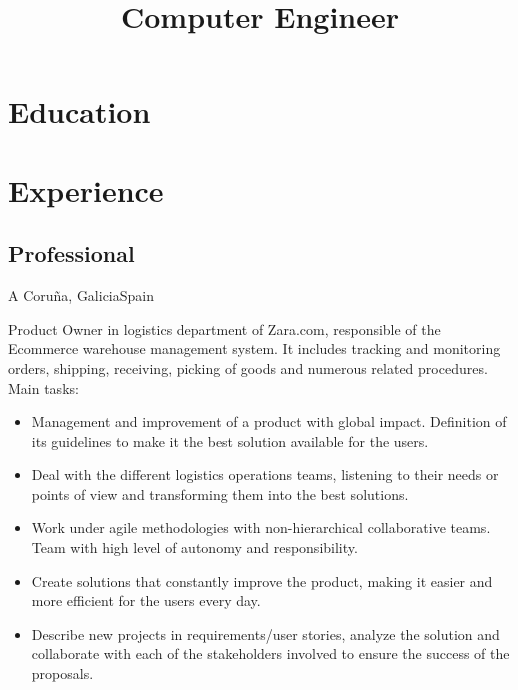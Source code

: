\documentclass[11pt,a4paper,sans]{moderncv}        %
\title{Computer Engineer}
\begin{document}
\makecvtitle

\section{Education}

\section{Experience}
\subsection{Professional}
 {A Coru\~{n}a, Galicia}{Spain}{
Product Owner in logistics department of Zara.com, responsible of the Ecommerce warehouse management system. It includes tracking and monitoring orders, shipping, receiving, picking of goods and numerous related procedures. Main tasks:
\begin{itemize}%
\item Management and improvement of a product with global impact. Definition of its guidelines to make it the best solution available for the users.
\item Deal with the different logistics operations teams, listening to their needs or points of view and transforming them into the best solutions.
\item Work under agile methodologies with non-hierarchical collaborative teams. Team with high level of autonomy and responsibility.
\item Create solutions that constantly improve the product, making it easier and more efficient for the users every day.
\item Describe new projects in requirements/user stories, analyze the solution and collaborate with each of the stakeholders involved to ensure the success of the proposals.
\end{itemize}}
\end{document}
